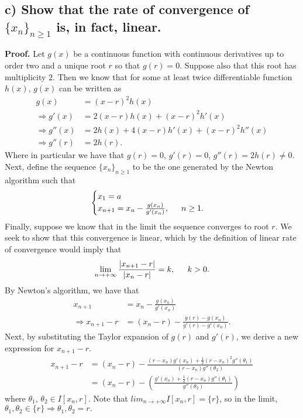 \documentclass[11pt, letterpaper]{article}
\begin{document}
\subsection*{c) \normalfont Show that the rate of convergence of $\{x_n\}_{n\geq 1}$ is, in fact, linear.}
{\bf Proof.} Let $g(x)$ be a continuous function with continuous derivatives up to order two and a unique root $r$ so that $g(r)=0$. 
Suppose also that this root has multiplicity $2$. Then we know that for some at least twice differentiable 
function $h(x)$, $g(x)$ can be written as
\begin{align*}
    g(x)&=(x-r)^2h(x)\\
    \Rightarrow g'(x)&=2(x-r)h(x)+(x-r)^2h'(x)\\
    \Rightarrow g''(x)&=2h(x)+4(x-r)h'(x)+(x-r)^2h''(x)\\
    \Rightarrow g''(r)&=2h(r).
\end{align*}
Where in particular we have that $g(r)=0$, $g'(r)=0$, $g''(r)=2h(r)\neq 0$. Next, define the sequence 
$\{x_n\}_{n\geq 1}$ to be the one generated by the Newton algorithm such that
\begin{align*}
    \begin{cases}
        x_1=a\\
        x_{n+1}=x_n-\frac{g(x_n)}{g'(x_n)}, \text{\indent $n\geq 1$.} 
    \end{cases}
\end{align*}
Finally, suppose we know that in the limit the sequence converges to root $r$. We seek to show that this convergence is linear,
which by the definition of linear rate of convergence would imply that
\begin{align*}
    \lim_{n\to+\infty}\frac{|x_{n+1}-r|}{|x_n-r|}=k,\text{\indent $k>0$.}
\end{align*}
By Newton's algorithm, we have that
\begin{align*}
    x_{n+1}&=x_n-\frac{g(x_n)}{g'(x_n)}\\
    \Rightarrow x_{n+1}-r&=(x_n-r)-\frac{g(r)-g(x_n)}{g'(r)-g'(x_n)}.
\end{align*}
Next, by substituting the Taylor expansion of $g(r)$ and $g'(r)$, we derive a new expression for $x_{n+1}-r$.
\begin{align*}
    x_{n+1}-r&=(x_n-r)-\frac{(r-x_n)g'(x_n)+\frac{1}{2}(r-x_n)^2g''(\theta_1)}{(r-x_n)g''(\theta_2)}\\
    &=(x_n-r)-\left(\frac{g'(x_n)+\frac{1}{2}(r-x_n)g''(\theta_1)}{g''(\theta_2)}\right)
\end{align*}
where $\theta_1$, $\theta_2\in I[x_n,r]$. Note that $lim_{n\to+\infty}I[x_n,r]=\{r\}$, so in the limit, $\theta_1,\theta_2\in\{r\}\Rightarrow\theta_1,\theta_2=r.$
\end{document}
